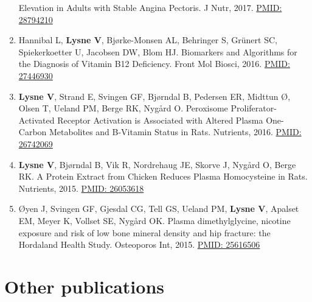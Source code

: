 \documentclass[11pt, a4paper]{awesome-cv}
\begin{document}
\begin{enumerate}
  Elevation in Adults with Stable Angina Pectoris. J Nutr, 2017.
  \href{https://www.ncbi.nlm.nih.gov/pubmed/28794210}{PMID: 28794210}
\item
  Hannibal L, \textbf{Lysne V}, Bjørke-Monsen AL, Behringer S, Grünert
  SC, Spiekerkoetter U, Jacobsen DW, Blom HJ. Biomarkers and Algorithms
  for the Diagnosis of Vitamin B12 Deficiency. Front Mol Biosci, 2016.
  \href{https://www.ncbi.nlm.nih.gov/pubmed/}{PMID: 27446930}
\item
  \textbf{Lysne V}, Strand E, Svingen GF, Bjørndal B, Pedersen ER,
  Midttun Ø, Olsen T, Ueland PM, Berge RK, Nygård O. Peroxisome
  Proliferator-Activated Receptor Activation is Associated with Altered
  Plasma One-Carbon Metabolites and B-Vitamin Status in Rats. Nutrients,
  2016. \href{https://www.ncbi.nlm.nih.gov/pubmed/26742069}{PMID:
  26742069}
\item
  \textbf{Lysne V}, Bjørndal B, Vik R, Nordrehaug JE, Skorve J, Nygård
  O, Berge RK. A Protein Extract from Chicken Reduces Plasma
  Homocysteine in Rats. Nutrients, 2015.
  \href{https://www.ncbi.nlm.nih.gov/pubmed/26053618}{PMID: 26053618}
\item
  Øyen J, Svingen GF, Gjesdal CG, Tell GS, Ueland PM, \textbf{Lysne V},
  Apalset EM, Meyer K, Vollset SE, Nygård OK. Plasma dimethylglycine,
  nicotine exposure and risk of low bone mineral density and hip
  fracture: the Hordaland Health Study. Osteoporos Int, 2015.
  \href{https://www.ncbi.nlm.nih.gov/pubmed/25616506}{PMID: 25616506}
\end{enumerate}

\hypertarget{other-publications}{%
\section{Other publications}\label{other-publications}}
\end{document}
